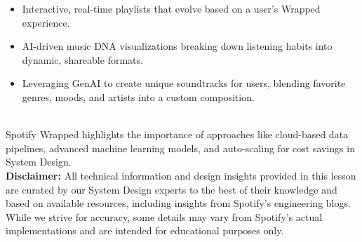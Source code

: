 \begin{itemize}
\item
\protect{}\label{hvFrXScJ3RLZO-yCpiaUp}
Interactive, real-time playlists that evolve based on a user's Wrapped experience.~
\item
\protect{}\label{zbGVpkHNr9P31Aus8y5wu}
AI-driven music DNA visualizations breaking down listening habits into dynamic, shareable formats.
\item
\protect{}\label{KbzelczrjhSfAgrsezXpf}
Leveraging GenAI to create unique soundtracks for users, blending favorite genres, moods, and artists into a custom composition.
\end{itemize}
\\
Spotify Wrapped highlights the importance of approaches like cloud-based data pipelines, advanced machine learning models, and auto-scaling for cost savings in System Design.
\\
\textbf{Disclaimer:} All technical information and design insights provided in this lesson are curated by our System Design experts to the best of their knowledge and based on available resources, including insights from Spotify's engineering blogs. While we strive for accuracy, some details may vary from Spotify's actual implementations and are intended for educational purposes only.

